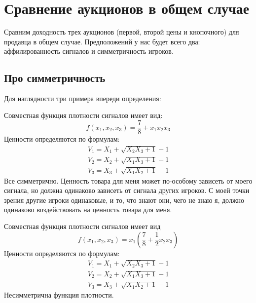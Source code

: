 \chapter{Сравнение аукционов в общем случае}



Сравним доходность трех аукционов (первой, второй цены и кнопочного) для продавца в общем случае. Предположений у нас будет всего два: аффилированность сигналов и симметричность игроков. 

\section{Про симметричность}
Для наглядности три примера впереди определения:

\begin{myex} Совместная функция плотности сигналов имеет вид:
\begin{equation}
f(x_{1},x_{2},x_{3})=\frac{7}{8}+x_{1}x_{2}x_{3}
\end{equation}
Ценности определяются по формулам:
\begin{equation}
\begin{array}{c}
V_{1}=X_{1}+\sqrt{X_{2}X_{3}+1}-1 \\
V_{2}=X_{2}+\sqrt{X_{1}X_{3}+1}-1 \\
V_{3}=X_{3}+\sqrt{X_{1}X_{2}+1}-1
\end{array}
\end{equation}
Все симметрично. Ценность товара для меня может по-особому зависеть от моего сигнала, но должна одинаково зависеть от сигнала других игроков. С моей точки зрения другие игроки одинаковые, и то, что знают они, чего не знаю я, должно одинаково воздействовать на ценность товара для меня.
\end{myex}


\begin{myex} Совместная функция плотности сигналов имеет вид 
\begin{equation}
f(x_{1},x_{2},x_{3})=x_{1}\left(\frac{7}{8}+\frac{1}{2}x_{2}x_{3}\right) 
\end{equation}
Ценности определяются по формулам:
\begin{equation}
\begin{array}{c}
V_{1}=X_{1}+\sqrt{X_{2}X_{3}+1}-1 \\
V_{2}=X_{2}+\sqrt{X_{1}X_{3}+1}-1 \\
V_{3}=X_{3}+\sqrt{X_{1}X_{2}+1}-1
\end{array}
\end{equation}
Несимметрична функция плотности.
\end{myex}

